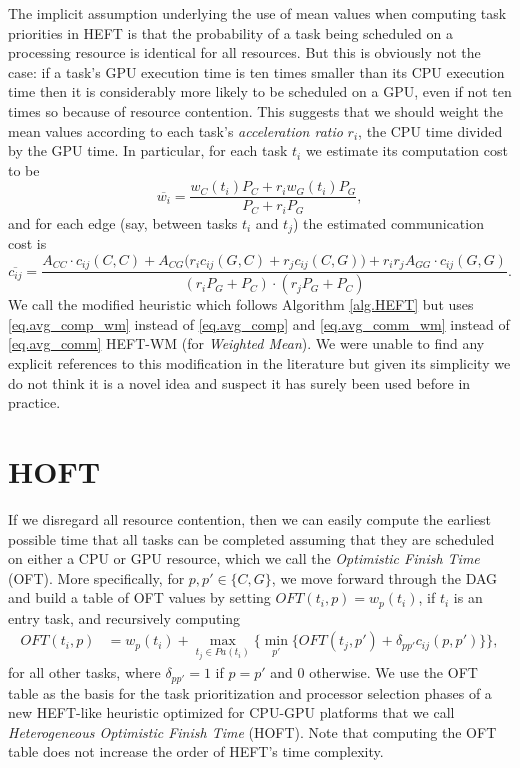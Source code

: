 \documentclass[runningheads]{llncs}
\begin{document}
The implicit assumption underlying the use of mean values when computing task priorities in HEFT is that the probability of a task being scheduled on a processing resource is identical for all resources. But this is obviously not the case: if a task's GPU execution time is ten times smaller than its CPU execution time then it is considerably more likely to be scheduled on a GPU, even if not ten times so because of resource contention. This suggests that we should weight the mean values according to each task's {\em acceleration ratio} $r_i$, the CPU time divided by the GPU time. In particular, for each task $t_i$ we estimate its computation cost to be
\begin{equation}
\label{eq.avg_comp_wm}
\overline{w_i} = \frac{w_C(t_i) P_C + r_iw_G(t_i) P_G}{P_C + r_iP_G},
\end{equation}  
and for each edge (say, between tasks $t_i$ and $t_j$) the estimated communication cost is
\begin{equation}
\label{eq.avg_comm_wm}
\overline{c_{ij}} = \frac{A_{CC} \cdot c_{ij}(C, C) + A_{CG}\big(r_ic_{ij}(G, C) + r_jc_{ij}(C, G)\big) + r_ir_j A_{GG} \cdot c_{ij}(G, G) }{(r_iP_G + P_C) \cdot (r_jP_G + P_C)}. 
\end{equation}
We call the modified heuristic which follows Algorithm \ref{alg.HEFT} but uses \eqref{eq.avg_comp_wm} instead of \eqref{eq.avg_comp} and \eqref{eq.avg_comm_wm} instead of \eqref{eq.avg_comm} HEFT-WM (for {\em Weighted Mean}). We were unable to find any explicit references to this modification in the literature but given its simplicity we do not think it is a novel idea and suspect it has surely been used before in practice.  


\section{HOFT}
\label{sect.hoft}

If we disregard all resource contention, then we can easily compute the earliest possible time that all tasks can be completed assuming that they are scheduled on either a CPU or GPU resource, which we call the {\em Optimistic Finish Time} (OFT). More specifically, for $p, p' \in \{C, G\}$, we move forward through the DAG and build a table of OFT values by setting $OFT(t_i, p) = w_p(t_i)$, if $t_i$ is an entry task, and recursively computing     
\begin{align}
\label{eq.oft_table}
OFT(t_i, p) &= w_p(t_i) + \max_{t_j \in Pa(t_i)} \bigg \{ \min_{p'} \{ OFT(t_j, p') + \delta_{pp'} c_{ij} (p, p') \}  \bigg \}, 
\end{align}
for all other tasks, where $\delta_{pp'} = 1$ if $p = p'$ and $0$ otherwise. We use the OFT table as the basis for the task prioritization and processor selection phases of a new HEFT-like heuristic optimized for CPU-GPU platforms that we call {\em Heterogeneous Optimistic Finish Time} (HOFT). Note that computing the OFT table does not increase the order of HEFT's time complexity.  
\end{document}
